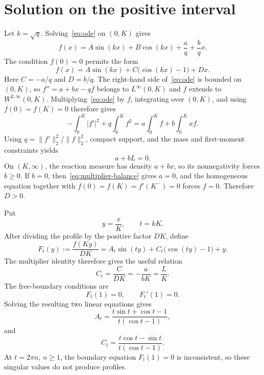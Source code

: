 \documentclass[11pt]{amsart}
\theoremstyle{definition}
\theoremstyle{remark}
\begin{document}
\section{Solution on the positive interval}
Let $k=\sqrt q$. Solving~\eqref{eq:ode} on $(0,K)$ gives
\[
 f(x)=A\sin(kx)+B\cos(kx)+\frac{a}{q}+\frac{b}{q}x.
\]
The condition $f(0)=0$ permits the form
\[
 f(x)=A\sin(kx)+C\bigl(\cos(kx)-1\bigr)+Dx.
\]
Here $C=-a/q$ and $D=b/q$. The right-hand side of~\eqref{eq:ode} is bounded
on $(0,K)$, so $f''=a+bx-qf$ belongs to $L^\infty(0,K)$ and $f$ extends to
$W^{2,\infty}(0,K)$. Multiplying~\eqref{eq:ode} by $f$, integrating over
$(0,K)$, and using $f(0)=f(K)=0$ therefore gives
\[
 -\int_0^K |f'|^2+q\int_0^K f^2
 =a\int_0^K f+b\int_0^K xf.
\]
Using $q=\|f'\|_2^2/\|f\|_2^2$, compact support, and the mass and
first-moment constraints yields
\begin{equation}\label{eq:multiplier-balance}
 a+bL=0.
\end{equation}
On $(K,\infty)$, the reaction measure has density $a+bx$, so its
nonnegativity forces $b\geq0$. If $b=0$, then~\eqref{eq:multiplier-balance}
gives $a=0$, and the homogeneous equation together with
$f(0)=f(K)=f'(K^-)=0$ forces $f=0$. Therefore $D>0$.

Put
\[
 y=\frac{x}{K},
 \qquad t=kK.
\]
After dividing the profile by the positive factor $DK$, define
\begin{equation}\label{eq:F}
 F_t(y):=\frac{f(Ky)}{DK}
 =A_t\sin(ty)+C_t\bigl(\cos(ty)-1\bigr)+y.
\end{equation}
The multiplier identity therefore gives the useful relation
\begin{equation}\label{eq:C-support}
 C_t=\frac{C}{DK}=-\frac{a}{bK}=\frac{L}{K}.
\end{equation}
The free-boundary conditions are
\[
 F_t(1)=0,
 \qquad F_t'(1)=0.
\]
Solving the resulting two linear equations gives
\begin{equation}\label{eq:A}
 A_t=\frac{t\sin t+\cos t-1}{t(\cos t-1)},
\end{equation}
and
\begin{equation}\label{eq:C}
 C_t=\frac{t\cos t-\sin t}{t(\cos t-1)}.
\end{equation}
At $t=2\pi n$, $n\geq1$, the boundary equation $F_t(1)=0$ is inconsistent,
so these singular values do not produce profiles.
\end{document}
